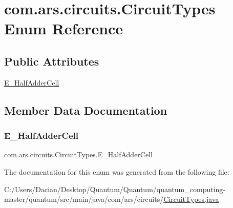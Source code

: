 \hypertarget{enumcom_1_1ars_1_1circuits_1_1_circuit_types}{}\section{com.\+ars.\+circuits.\+Circuit\+Types Enum Reference}
\label{enumcom_1_1ars_1_1circuits_1_1_circuit_types}
\subsection*{Public Attributes}
\begin{DoxyCompactItemize}
\item 
\hyperlink{enumcom_1_1ars_1_1circuits_1_1_circuit_types_a63e41e3d70dad2b10cc47aeef161755f}{E\+\_\+\+Half\+Adder\+Cell}
\end{DoxyCompactItemize}


\subsection{Member Data Documentation}
\hypertarget{enumcom_1_1ars_1_1circuits_1_1_circuit_types_a63e41e3d70dad2b10cc47aeef161755f}{}\label{enumcom_1_1ars_1_1circuits_1_1_circuit_types_a63e41e3d70dad2b10cc47aeef161755f} 
\subsubsection{\texorpdfstring{E\+\_\+\+Half\+Adder\+Cell}{E\_HalfAdderCell}}
{\footnotesize\ttfamily com.\+ars.\+circuits.\+Circuit\+Types.\+E\+\_\+\+Half\+Adder\+Cell}



The documentation for this enum was generated from the following file\+:\begin{DoxyCompactItemize}
\item 
C\+:/\+Users/\+Dacian/\+Desktop/\+Quantum/\+Quantum/quantum\+\_\+computing-\/master/quantum/src/main/java/com/ars/circuits/\hyperlink{_circuit_types_8java}{Circuit\+Types.\+java}\end{DoxyCompactItemize}
